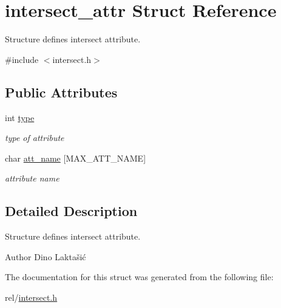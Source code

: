 \hypertarget{structintersect__attr}{}\section{intersect\+\_\+attr Struct Reference}
\label{structintersect__attr}


Structure defines intersect attribute.  




{\ttfamily \#include $<$intersect.\+h$>$}

\subsection*{Public Attributes}
\begin{DoxyCompactItemize}
\item 
int \hyperlink{structintersect__attr_a309cf5c27cb6bad9d421e0cec60a733f}{type}\hypertarget{structintersect__attr_a309cf5c27cb6bad9d421e0cec60a733f}{}\label{structintersect__attr_a309cf5c27cb6bad9d421e0cec60a733f}

\begin{DoxyCompactList}\small\item\em type of attribute \end{DoxyCompactList}\item 
char \hyperlink{structintersect__attr_a2def8cfafc023b1052438588af1d38b1}{att\+\_\+name} \mbox{[}M\+A\+X\+\_\+\+A\+T\+T\+\_\+\+N\+A\+ME\mbox{]}\hypertarget{structintersect__attr_a2def8cfafc023b1052438588af1d38b1}{}\label{structintersect__attr_a2def8cfafc023b1052438588af1d38b1}

\begin{DoxyCompactList}\small\item\em attribute name \end{DoxyCompactList}\end{DoxyCompactItemize}


\subsection{Detailed Description}
Structure defines intersect attribute. 

\begin{DoxyAuthor}{Author}
Dino Laktašić 
\end{DoxyAuthor}


The documentation for this struct was generated from the following file\+:\begin{DoxyCompactItemize}
\item 
rel/\hyperlink{intersect_8h}{intersect.\+h}\end{DoxyCompactItemize}
